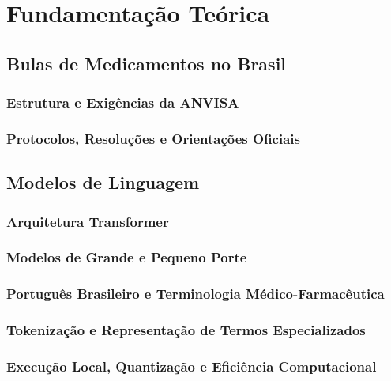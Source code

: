 \chapter{Fundamentação Teórica}

\section{Bulas de Medicamentos no Brasil}

\subsection{Estrutura e Exigências da ANVISA}

\subsection{Protocolos, Resoluções e Orientações Oficiais}


\section{Modelos de Linguagem}

\subsection{Arquitetura Transformer}

\subsection{Modelos de Grande e Pequeno Porte}

\subsection{Português Brasileiro e Terminologia Médico-Farmacêutica}

\subsection{Tokenização e Representação de Termos Especializados}

\subsection{Execução Local, Quantização e Eficiência Computacional}


